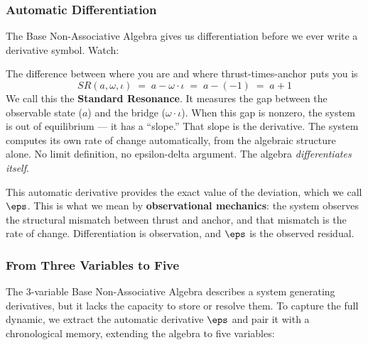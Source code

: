 \subsubsection*{Automatic Differentiation}

The Base Non-Associative Algebra gives us differentiation before we ever write a derivative symbol. Watch:

The difference between where you are and where thrust-times-anchor puts you is
$$SR(a, \omega, \iota) \;=\; a - \omega \cdot \iota \;=\; a - (-1) \;=\; a + 1$$
We call this the \textbf{Standard Resonance}. It measures the gap between the observable state ($a$) and the bridge ($\omega \cdot \iota$). When this gap is nonzero, the system is out of equilibrium --- it has a ``slope.'' That slope is the derivative. The system computes its own rate of change automatically, from the algebraic structure alone. No limit definition, no epsilon-delta argument. The algebra \emph{differentiates itself}.

This automatic derivative provides the exact value of the deviation, which we call $\eps$. This is what we mean by \textbf{observational mechanics}: the system observes the structural mismatch between thrust and anchor, and that mismatch is the rate of change. Differentiation is observation, and $\eps$ is the observed residual.

\subsubsection*{From Three Variables to Five}

The 3-variable Base Non-Associative Algebra describes a system generating derivatives, but it lacks the capacity to store or resolve them. To capture the full dynamic, we extract the automatic derivative $\eps$ and pair it with a chronological memory, extending the algebra to five variables:

